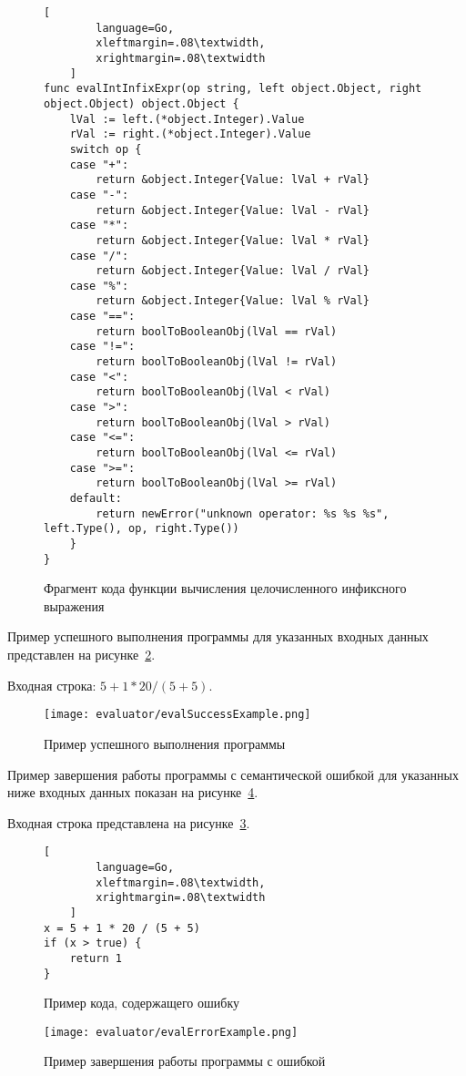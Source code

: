 \begin{figure}[!htb]
	\centering
	\begin{lstlisting}[
        language=Go,
        xleftmargin=.08\textwidth,
        xrightmargin=.08\textwidth
    ]
func evalIntInfixExpr(op string, left object.Object, right object.Object) object.Object {
    lVal := left.(*object.Integer).Value
    rVal := right.(*object.Integer).Value
    switch op {
    case "+":
        return &object.Integer{Value: lVal + rVal}
    case "-":
        return &object.Integer{Value: lVal - rVal}
    case "*":
        return &object.Integer{Value: lVal * rVal}
    case "/":
        return &object.Integer{Value: lVal / rVal}
    case "%":
        return &object.Integer{Value: lVal % rVal}
    case "==":
        return boolToBooleanObj(lVal == rVal)
    case "!=":
        return boolToBooleanObj(lVal != rVal)
    case "<":
        return boolToBooleanObj(lVal < rVal)
    case ">":
        return boolToBooleanObj(lVal > rVal)
    case "<=":
        return boolToBooleanObj(lVal <= rVal)
    case ">=":
        return boolToBooleanObj(lVal >= rVal)
    default:
        return newError("unknown operator: %s %s %s", left.Type(), op, right.Type())
    }
}
\end{lstlisting}
	\caption{Фрагмент кода функции вычисления целочисленного инфиксного выражения}
	\label{f:code_evalIntInfixExpr}
\end{figure}


Пример успешного выполнения программы для указанных входных данных представлен на рисунке~\ref{f:evalSuccessExample}.

Входная строка: $5 + 1 * 20 / (5 + 5)$.

\clearpage

\begin{figure}[!htb]
	\centering
	\texttt{[image: evaluator/evalSuccessExample.png]}
	\caption{Пример успешного выполнения программы}
	\label{f:evalSuccessExample}
\end{figure}

Пример завершения работы программы с семантической ошибкой для указанных ниже входных данных показан на рисунке~\ref{f:evalErrorExample}.

Входная строка представлена на рисунке~\ref{f:code_evalErrorExample}.

\begin{figure}[!htb]
	\centering
    \vspace{\toppaddingoffigure}
	\begin{lstlisting}[
        language=Go,
        xleftmargin=.08\textwidth,
        xrightmargin=.08\textwidth
    ]
x = 5 + 1 * 20 / (5 + 5)
if (x > true) {
    return 1
}    
\end{lstlisting}
	\caption{Пример кода, содержащего ошибку}
	\label{f:code_evalErrorExample}
\end{figure}

\begin{figure}[!htb]
	\centering
	\texttt{[image: evaluator/evalErrorExample.png]}
	\caption{Пример завершения работы программы с ошибкой}
	\label{f:evalErrorExample}
\end{figure}

\pagebreak